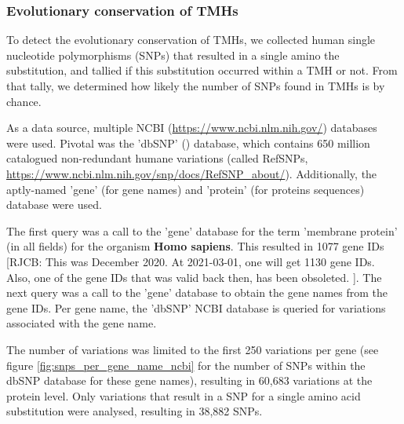 \subsubsection{Evolutionary conservation of TMHs}


To detect the evolutionary conservation of TMHs,
we collected human single nucleotide polymorphisms (SNPs)
that resulted in a single amino the substitution,
and tallied if this substitution occurred within a TMH or not.
From that tally, we determined how likely the number of SNPs
found in TMHs is by chance.


As a data source, multiple
NCBI (\url{https://www.ncbi.nlm.nih.gov/}) databases were used.
Pivotal was the 'dbSNP' (\cite{sherry2001dbsnp}) database,
which contains 650 million 
catalogued non-redundant humane variations (called RefSNPs,
\url{https://www.ncbi.nlm.nih.gov/snp/docs/RefSNP_about/}).
Additionally, the aptly-named 'gene' (for gene names)
and 'protein' (for proteins sequences) database were used.


The first query was a call to the 'gene' database for the 
term 'membrane protein' (in all fields) for the organism \textbf{Homo sapiens}.
This resulted in 1077 gene IDs
[RJCB:
  This was December 2020.
  At 2021-03-01, one will get 1130 gene IDs.
  Also, one of the gene IDs that was valid back then,
  has been obsoleted.
].
The next query was a call to the 'gene' database 
to obtain the gene names from the gene IDs.
Per gene name, the 'dbSNP' NCBI database is queried for 
variations associated with the gene name. 

The number of variations
was limited to the first 250 variations per gene (see figure
\ref{fig:snps_per_gene_name_ncbi} for the number of SNPs
within the dbSNP database for these gene names),
resulting in 60,683 variations at the protein level.
Only variations that result in a SNP for
a single amino acid substitution were analysed, resulting in 38,882 SNPs.

